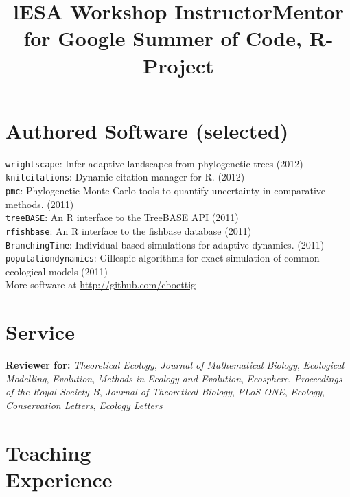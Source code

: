 \documentclass[margin]{res}
\begin{document}
\begin{resume}
\section{Authored Software (selected)} 
{ \footnotesize
\texttt{wrightscape}: Infer adaptive landscapes from phylogenetic trees (2012) \\
\texttt{knitcitations}: Dynamic citation manager for R. (2012) \\
\texttt{pmc}: Phylogenetic Monte Carlo tools to quantify uncertainty in comparative methods. (2011)\\
\texttt{treeBASE}: An R interface to the TreeBASE API (2011) \\
\texttt{rfishbase}: An R interface to the fishbase database (2011) \\
\texttt{BranchingTime}: Individual based simulations for adaptive dynamics. (2011) \\
\texttt{populationdynamics}: Gillespie algorithms for exact simulation of common ecological models (2011) \\ 
More software at \href{http://github.com/cboettig}{http://github.com/cboettig}
}

\section{Service}

\textbf{Reviewer for:}   \emph{Theoretical Ecology}, \emph{Journal of Mathematical Biology}, \emph{Ecological Modelling},
\emph{Evolution}, \emph{Methods in Ecology and Evolution}, \emph{Ecosphere}, \emph{Proceedings of the Royal Society B}, \emph{Journal of Theoretical Biology}, \emph{PLoS ONE}, \emph{Ecology}, \emph{Conservation Letters}, \emph{Ecology Letters} 


\section{Teaching\\Experience}
\begin{format}
\title{l}\\
\body
\end{format}

\title{ESA Workshop Instructor}
\begin{position}  
  \vspace{-.5cm}
\end{position}

\title{Mentor for Google Summer of Code, R-Project}
\begin{position}
  \vspace{-.5cm}
\end{position}


\end{resume}
\end{document}
